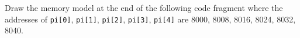 Draw the memory model at the end of the following code fragment where the addresses of \texttt{pi[0]}, \texttt{pi[1]}, \texttt{pi[2]}, \texttt{pi[3]}, \texttt{pi[4]} are 8000, 8008, 8016, 8024, 8032, 8040.

